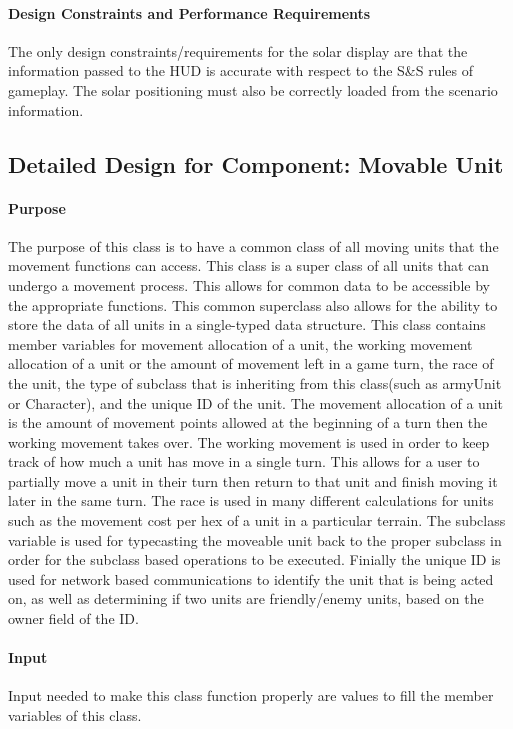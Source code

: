 \documentclass[12pt,a4paper,titlepage]{article}
\begin{document}
\paragraph{Design Constraints and Performance Requirements} The only design constraints/requirements for the solar display are that the information passed to the HUD is accurate with respect to the S\&S rules of gameplay. The solar positioning must also be correctly loaded from the scenario information. 

\subsection{Detailed Design for Component: Movable Unit}
\paragraph{Purpose} The purpose of this class is to have a common class of all moving units that the movement functions can access. This class is a super class of all units that can undergo a movement process. This allows for common data to be accessible by the appropriate functions. This common superclass also allows for the ability to store the data of all units in a single-typed data structure. This class contains member variables for movement allocation of a unit, the working movement allocation of a unit or the amount of movement left in a game turn, the race of the unit, the type of subclass that is inheriting from this class(such as armyUnit or Character), and the unique ID of the unit. The movement allocation of a unit is the amount of movement points allowed at the beginning of a turn then the working movement takes over. The working movement is used in order to keep track of how much a unit has move in a single turn. This allows for a user to partially move a unit in their turn then return to that unit and finish moving it later in the same turn. The race is used in many different calculations for units such as the movement cost per hex of a unit in a particular terrain. The subclass variable is used for typecasting the moveable unit back to the proper subclass in order for the subclass based operations to be executed. Finially the unique ID is used for network based communications to identify the unit that is being acted on, as well as determining if two units are friendly/enemy units, based on the owner field of the ID. 
\paragraph{Input} Input needed to make this class function properly are values to fill the member variables of this class. 
\end{document}
